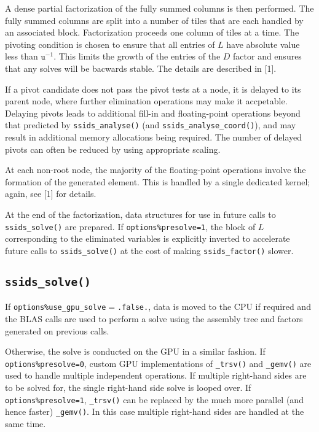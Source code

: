 \documentclass{spral}
\begin{document}
A dense partial factorization of the fully summed columns is then performed. The
fully summed columns are split into a number
of tiles that are each handled by an associated  block. Factorization
proceeds one column of tiles at a time. The pivoting condition is chosen to
ensure that all entries of $L$ have absolute value less than $\texttt{u}^{-1}$.
This limits the growth of the entries of the $D$ factor and ensures that any
solves will be bacwards stable. The details are described in [1].

If a pivot candidate does not pass the pivot tests at a node, it is delayed
to its parent node, where further elimination operations may make it accpetable.
Delaying pivots leads to additional fill-in and floating-point
operations beyond that predicted by {\tt ssids\_analyse()}  (and {\tt ssids\_analyse\_coord()}), 
and may result in additional memory allocations being required.
The number of delayed pivots can often be reduced by using appropriate scaling.

At each non-root node, the majority of the floating-point operations  involve the formation
of the generated element. 
This is handled by a single dedicated kernel; again, see [1] for details.

At the end of the factorization, data structures for use in future calls to
\texttt{ssids\_solve()} are prepared. If \texttt{options\%presolve=1}, the
block of $L$ corresponding to the eliminated variables is explicitly inverted
to accelerate future calls to \texttt{ssids\_solve()} at the cost of making
\texttt{ssids\_factor()} slower.

\subsection*{\texttt{ssids\_solve()}}
If \texttt{options\%use\_gpu\_solve}$=$\texttt{.false.}, data is moved to the
CPU if required and the BLAS calls are used to perform a solve using the
assembly tree and factors generated on previous calls.

Otherwise, the solve is conducted on the GPU in a similar fashion. If
\texttt{options\%presolve=0}, custom GPU implementations of \texttt{\_trsv()}
and \texttt{\_gemv()} are used to handle multiple independent operations. If
multiple right-hand sides are to be solved for, the single right-hand side solve is looped over. If \texttt{options\%presolve=1}, \texttt{\_trsv()} can be
replaced by the much more parallel (and hence faster) \texttt{\_gemv()}. In
this case multiple right-hand sides are handled at the same time.
\end{document}
